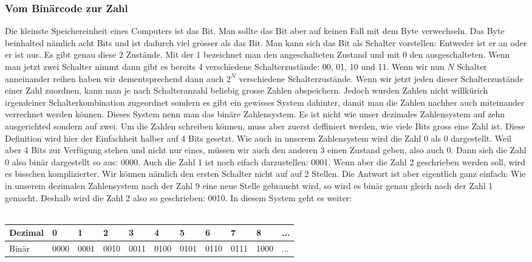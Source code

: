 \subsubsection{Vom Binärcode zur Zahl}
Die kleinste Speichereinheit eines Computers ist das Bit. Man sollte das Bit aber auf keinen Fall mit dem Byte verwechseln. Das Byte beinhalted nämlich acht Bits und ist dadurch viel grösser als das Bit. Man kann sich das Bit als Schalter vorstellen: Entweder ist er an oder er ist aus. Es gibt genau diese 2 Zustände. Mit der 1 bezeichnet man den angeschalteten Zustand und mit 0 den ausgeschalteten. Wenn man jetzt zwei Schalter nimmt dann gibt es bereits 4 verschiedene Schalterzustände: 00, 01, 10 und 11. Wenn wir nun $N$ Schalter anneinander reihen haben wir dementsprechend dann auch $2^N$ verschiedene Schalterzustände. Wenn wir jetzt jeden dieser Schalterzustände einer Zahl zuordnen, kann man je nach Schalteranzahl beliebig grosse Zahlen abspeichern. Jedoch wurden Zahlen nicht willkürich irgendeiner Schalterkombination zugeordnet sondern es gibt ein gewisses System dahinter, damit man die Zahlen nachher auch miteinander verrechnet werden können. Dieses System nenn man das binäre Zahlensystem. Es ist nicht wie unser dezimales Zahlensystem auf zehn ausgerichted sondern auf zwei. Um die Zahlen schreiben können, muss aber zuerst deffiniert werden, wie viele Bits gross eine Zahl ist. Diese Definition wird hier der Einfachheit halber auf 4 Bits gesetzt. Wie auch in unserem Zahlensystem wird die Zahl 0 als 0 dargestellt. Weil aber 4 Bits zur Verfügung stehen und nicht nur eines, müssen wir auch den anderen 3 einen Zustand geben, also auch 0. Dann sieh die Zahl 0 also binär dargestellt so aus: 0000. Auch die Zahl 1 ist noch eifach darzustellen: 0001. Wenn aber die Zahl 2 geschrieben werden soll, wird es bisschen komplizierter. Wir können nämlich den ersten Schalter nicht auf auf 2 Stellen. Die Antwort ist aber eigentlich ganz einfach: Wie in unserem dezimalen Zahlensystem nach der Zahl 9 eine neue Stelle gebraucht wird, so wird es binär genau gleich nach der Zahl 1 gemacht. Deshalb wird die Zahl 2 also so geschrieben: 0010. In diesem System geht es weiter: \\
\\
\begin{tabular}{l|l|l|l|l|l|l|l|l|l|l}
Dezimal & 0 & 1 & 2 & 3 & 4 & 5 & 6 & 7 & 8 &  ...\\ \hline
Binär & 0000 & 0001 & 0010 & 0011 & 0100 & 0101 & 0110 & 0111 & 1000 & ...\\
\end{tabular}  \\

